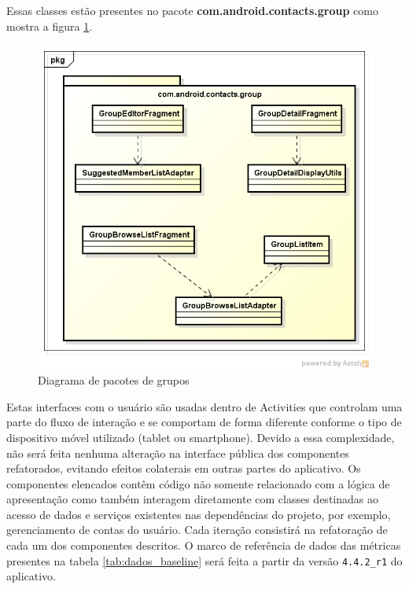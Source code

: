 Essas classes estão presentes no pacote \textbf{com.android.contacts.group} como
mostra a figura \ref{fig:classes_group_baseline}.

\begin{figure}[htb]
	\label{fig:classes_group_baseline}
	\caption{Diagrama de pacotes de grupos}   
	\begin{center}
		\includegraphics[scale=0.53]{img/classes_group_baseline.png}
	\end{center}
\end{figure}

Estas interfaces com o usuário são usadas dentro de Activities que controlam uma
parte do fluxo de interação e se comportam de forma diferente conforme o tipo de dispositivo
móvel utilizado (tablet ou smartphone). Devido a essa complexidade, não será
feita nenhuma alteração na interface pública dos componentes refatorados, evitando efeitos colaterais em
outras partes do aplicativo. Os componentes elencados contêm código não somente
relacionado com a lógica de apresentação como também interagem diretamente com classes destinadas ao acesso
de dados e serviços existentes nas dependências do projeto, por exemplo,
gerenciamento de contas do usuário.  Cada iteração consistirá na refatoração de
cada um dos componentes descritos. O marco de referência de dados das métricas presentes na tabela \ref{tab:dados_baseline} será feita a partir da
versão \verb|4.4.2_r1| do aplicativo.

